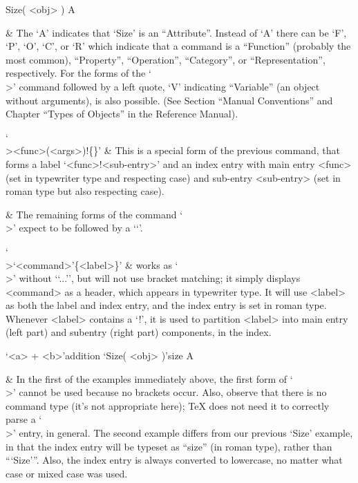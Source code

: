 \begintt 
\>Size( <obj> ) A
\endtt

  & The `A' indicates that `Size' is an  ``Attribute''.  Instead  of  `A'
    there can be `F', `P', `O', `C', or `R' which indicate that a command
    is  a  ``Function''  (probably  the   most   common),   ``Property'',
    ``Operation'', ``Category'', or ``Representation'', respectively. For
    the forms of  the  `\\>'  command  followed  by  a  left  quote,  `V'
    indicating  ``Variable''  (an  object  without  arguments),  is  also
    possible.  (See Section ``Manual Conventions'' and
    Chapter ``Types of Objects'' in the {\GAP} Reference Manual).

`\\><func>(<args>)!\{<sub-entry>\}' &
    This is a special form of the previous command, that  forms  a  label
    `<func>!<sub-entry>' and an index entry with main entry  <func>  (set
    in typewriter type and respecting  case)  and  sub-entry  <sub-entry>
    (set in roman type but also respecting case).

  & The remaining forms of the command `\\>' expect to be followed by a
    `\lq'.

`\\>\lq<command>\rq\{<label>\}' &
    works  as  `\\>'  without  `\lq...\rq',  but  will  not  use  bracket
    matching; it simply displays <command> as a header, which appears  in
    typewriter type. It will use <label> as  both  the  label  and  index
    entry, and the index entry is set in  roman  type.  Whenever  <label>
    contains a `!', it is used to partition <label> into main entry (left
    part) and subentry (right part) components, in the index.

\begintt
\>`<a> + <b>'{addition}
\>`Size( <obj> )'{size} A
\endtt

  & In the first of the examples immediately above,  the  first  form  of
    `\\>' cannot be used because no brackets occur.  Also,  observe  that
    there is no command type (it's not appropriate here); {\TeX} does not
    need it to correctly parse a `\\>'  entry,  in  general.  The  second
    example differs from our previous `Size' example, in that  the  index
    entry will be typeset  as  ``size''  (in  roman  type),  rather  than
    ``{`Size'}''. Also, the index entry is always converted to lowercase,
    no matter what case or mixed case was used.


